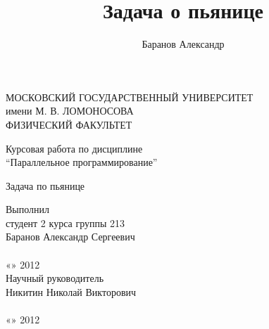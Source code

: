 \documentclass{article}
\title{Задача о пьянице}
\author{Баранов Александр}
\date{}
\begin{document}
 
    \begin{titlepage}
    \begin{center}
        \large{МОСКОВСКИЙ ГОСУДАРСТВЕННЫЙ УНИВЕРСИТЕТ\\
        имени М. В. ЛОМОНОСОВА\\
        \underline{\hspace{\textwidth}}
        ФИЗИЧЕСКИЙ ФАКУЛЬТЕТ}\\
        
        \vspace{30pt} %

        Курсовая работа по дисциплине\\
        ``Параллельное программирование''

        \vspace{100pt} %

        \Large{Задача по пьянице}

        \vspace{100pt} %
    \end{center}
    
        \begin{flushright}
            \large{Выполнил\\
            студент 2 курса группы 213\\
            Баранов Александр Сергеевич\\
            \underline{\hspace{14em}}\\
            «\underline{\hspace{1em}}»\underline{\hspace{10em}} 2012\\
            }
            \vspace{50pt}
            \large{Научный руководитель\\
            Никитин Николай Викторович\\
            \underline{\hspace{14em}}\\
            «\underline{\hspace{1em}}»\underline{\hspace{10em}} 2012
            }
        \end{flushright}
        

\end{titlepage}
\end{document}
